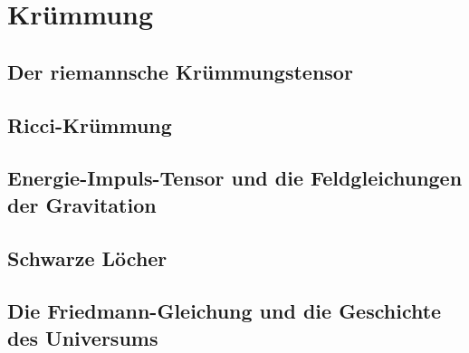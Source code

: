 %
%
%
\chapter{Krümmung
\label{chapter:kruemmung}}


\section{Der riemannsche Krümmungstensor}

\section{Ricci-Krümmung}

\section{Energie-Impuls-Tensor und die Feldgleichungen der Gravitation}

\section{Schwarze Löcher}

\section{Die Friedmann-Gleichung und die Geschichte des Universums}

